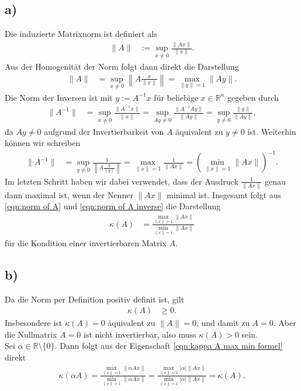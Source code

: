 \documentclass[english, parskip=full]{scrartcl}
\newcommand{\kla}{}
\begin{document}
\subsection*{a)}
Die induzierte Matrixnorm ist definiert als
\begin{align}
\|A\| &:= \sup_{x\neq 0}\frac{\|Ax\|}{\|x\|}.
\end{align}
Aus der Homogenität der Norm folgt dann direkt die Darstellung
\begin{align}
\|A\| &= \sup_{x\neq 0}\left\|A\frac{x}{\|x\|}\right\| = \max_{\|y \| = 1}\|A y\|. \label{eqn:norm of A}
\end{align}
Die Norm der Inversen ist mit $y := A^{-1}x$ für beliebige $x\in\mathbb{R}^n$ gegeben durch
\begin{align}
\|A^{-1}\| &= \sup_{x\neq 0}\frac{\|A^{-1}x\|}{\| x \|} = \sup_{Ay \neq 0} \frac{\|A^{-1}Ay\|}{\|Ay\|} = \sup_{y \neq 0} \frac{\|y\|}{\|Ay\|},
\end{align}
da $Ay\neq 0$ aufgrund der Invertierbarkeit von $A$ äquivalent zu $y\neq 0$ ist.
Weiterhin können wir schreiben
\begin{align}
\|A^{-1}\| &= \sup_{y\neq 0}\frac{1}{\left\| A \frac{y}{\|y\|}\right\|} = \max_{\|x\| = 1} \frac{1}{\|Ax\|} = \kla\left( \min_{\|x\| = 1}\|Ax\| \right)^{-1}. \label{eqn:norm of A inverse}
\end{align}
Im letzten Schritt haben wir dabei verwendet, dass der Ausdruck $\frac{1}{\|Ax\|}$ genau dann maximal ist, wenn der Nenner $\|Ax\|$ minimal ist.
Insgesamt folgt aus \eqref{eqn:norm of A} und \eqref{eqn:norm of A inverse} die Darstellung
\begin{align}
\kappa (A) &= \frac{\underset{\|x\| = 1}{\max}\|Ax\|}{\underset{\|x\| = 1}{\min}\|Ax\|} \label{eqn:kappa A max min formel}
\end{align}
für die Kondition einer invertierbaren Matrix $A$.
\subsection*{b)}
Da die Norm per Definition positiv definit ist, gilt 
\begin{align}
\kappa(A) &\ge 0.
\end{align}
Insbesondere ist $\kappa (A) = 0$ äquivalent zu $\|A\| = 0$, und damit zu $A = 0$.
Aber die Nullmatrix $A=0$ ist nicht invertierbar, also muss $\kappa(A) > 0$ sein.
\\
Sei $\alpha\in\mathbb{R}\setminus\{0\}$. Dann folgt aus der Eigenschaft \eqref{eqn:kappa A max min formel} direkt
\begin{align}
\kappa (\alpha A) = \frac{\underset{\|x\| = 1}{\max}\|\alpha Ax\|}{\underset{\|x\| = 1}{\min}\|\alpha Ax\|} = \frac{\underset{\|x\| = 1}{\max}|\alpha|\| Ax\|}{\underset{\|x\| = 1}{\min}|\alpha|\| Ax\|} = \kappa (A).
\end{align}
\end{document}
